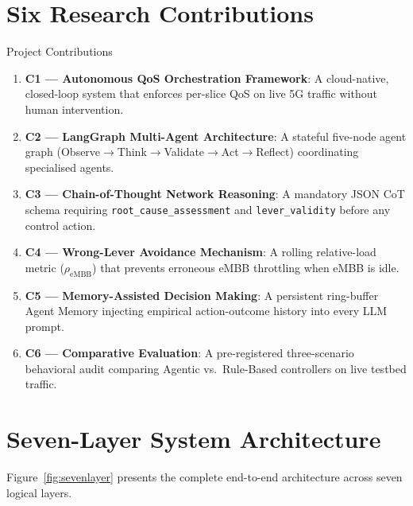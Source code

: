 \section{Six Research Contributions}
\begin{contribbox}{Project Contributions}
\begin{enumerate}[noitemsep,leftmargin=*]
  \item \textbf{C1 — Autonomous QoS Orchestration Framework}: A cloud-native, closed-loop system that enforces per-slice QoS on live 5G traffic without human intervention.
  \item \textbf{C2 — LangGraph Multi-Agent Architecture}: A stateful five-node agent graph (Observe$\to$Think$\to$Validate$\to$Act$\to$Reflect) coordinating specialised agents.
  \item \textbf{C3 — Chain-of-Thought Network Reasoning}: A mandatory JSON CoT schema requiring \texttt{root\_cause\_assessment} and \texttt{lever\_validity} before any control action.
  \item \textbf{C4 — Wrong-Lever Avoidance Mechanism}: A rolling relative-load metric ($\rho_{\text{eMBB}}$) that prevents erroneous eMBB throttling when eMBB is idle.
  \item \textbf{C5 — Memory-Assisted Decision Making}: A persistent ring-buffer Agent Memory injecting empirical action-outcome history into every LLM prompt.
  \item \textbf{C6 — Comparative Evaluation}: A pre-registered three-scenario behavioral audit comparing Agentic vs.\ Rule-Based controllers on live testbed traffic.
\end{enumerate}
\end{contribbox}

\section{Seven-Layer System Architecture}

Figure~\ref{fig:sevenlayer} presents the complete end-to-end architecture across seven logical layers.

